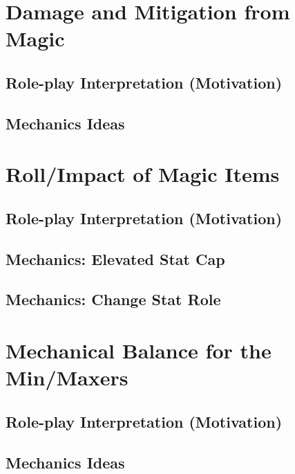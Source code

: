 \documentclass{article}
\begin{document}
\section{Damage and Mitigation from Magic}
    
    \subsection{Role-play Interpretation (Motivation)}
        
    \subsection{Mechanics Ideas}
        
        
        
\section{Roll/Impact of Magic Items}\label{sec:MagicItems}
    
    \subsection{Role-play Interpretation (Motivation)}
        
    \subsection{Mechanics: Elevated Stat Cap}\label{subsec:magicItemStatCap}
        
    \subsection{Mechanics: Change Stat Role}\label{subsec:magicItemStatChange}
        
        
        
        
\section{Mechanical Balance for the Min/Maxers}
    
    \subsection{Role-play Interpretation (Motivation)}
        
    \subsection{Mechanics Ideas}
        
    
        
\end{document}
